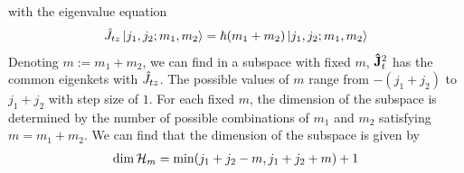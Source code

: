 with the eigenvalue equation
\begin{align}
    \hat{J}_{tz} \ket{j_1,j_2;m_1,m_2} = \hbar (m_1 + m_2) \ket{j_1,j_2;m_1,m_2}
\end{align}
Denoting $m := m_1 + m_2$, we can find in a subspace with fixed $m$, $\mathbf{\hat{J}}_t^2$ has the common eigenkets with $\hat{J}_{tz}$. The possible values of $m$ range from $-(j_1 + j_2)$ to $j_1 + j_2$ with step size of $1$. For each fixed $m$, the dimension of the subspace is determined by the number of possible combinations of $m_1$ and $m_2$ satisfying $m = m_1 + m_2$. We can find that the dimension of the subspace is given by
\begin{align}
    \dim{\mathcal{H}_m} = \min(j_1 + j_2 - m, j_1 + j_2 + m) + 1
\end{align}





